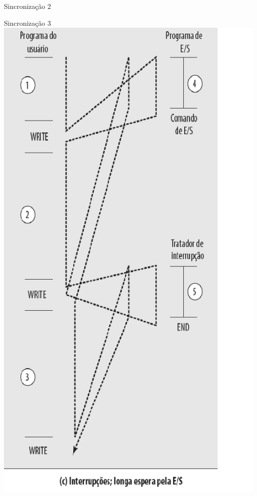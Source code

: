 \begin{slide}{Sincronização 2}
\end{slide}

\begin{slide}{Sincronização 3}
   \centering
   \includegraphics[height=0.8\textheight]{figs/int03.eps}

\end{slide}
